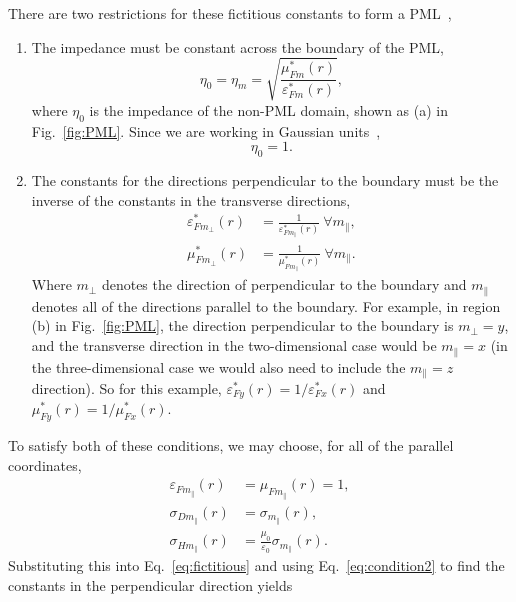 \documentclass[12pt,twocolumn]{article}
\begin{document}
There are two restrictions for these fictitious constants to form a PML~\cite{Sacks95},
\begin{enumerate}
\item The impedance must be constant across the boundary of the PML,
\begin{equation}
\eta_0=\eta_m=\sqrt{\frac{\mu_{Fm}^*(r)}{\varepsilon_{Fm}^*(r)}},
\end{equation}
where $\eta_0$ is the impedance of the non-PML domain, shown as (a) in Fig.~\ref{fig:PML}. Since we are working in Gaussian units~\cite{Sullivan00,Kitano06},
\begin{equation}
\eta_0=1.
\end{equation}
\item The constants for the directions perpendicular to the boundary must be the inverse of the constants in the transverse directions,
\begin{equation}
\begin{aligned}
\label{eq:condition2}
\varepsilon_{Fm_\perp}^*(r)&=\frac{1}{\varepsilon_{Fm_\parallel}^*(r)}~\forall m_\parallel,\\
\mu_{Fm_\perp}^*(r)&=\frac{1}{\mu_{Fm_\parallel}^*(r)}~\forall m_\parallel.
\end{aligned}
\end{equation}
Where $m_\perp$ denotes the direction of perpendicular to the boundary and $m_\parallel$ denotes all of the directions parallel to the boundary. For example, in region (b) in Fig.~\ref{fig:PML}, the direction perpendicular to the boundary is $m_\perp=y$, and the transverse direction in the two-dimensional case would be $m_\parallel=x$ (in the three-dimensional case we would also need to include the $m_\parallel=z$ direction). So for this example, $\varepsilon_{Fy}^*(r)=1/\varepsilon_{Fx}^*(r)$ and $\mu_{Fy}^*(r)=1/\mu_{Fx}^*(r)$.
\end{enumerate}
To satisfy both of these conditions, we may choose, for all of the parallel coordinates,
\begin{equation}
\begin{aligned}
\varepsilon_{Fm_\parallel}(r)&=\mu_{Fm_\parallel}(r)=1,\\
\sigma_{Dm_\parallel}(r) &= \sigma_{m_\parallel}(r),\\
\sigma_{Hm_\parallel}(r) &= \frac{\mu_0}{\varepsilon_0}\sigma_{m_\parallel}(r).
\end{aligned}
\end{equation}
Substituting this into Eq.~\ref{eq:fictitious} and using Eq.~\ref{eq:condition2} to find the constants in the perpendicular direction yields
\end{document}
